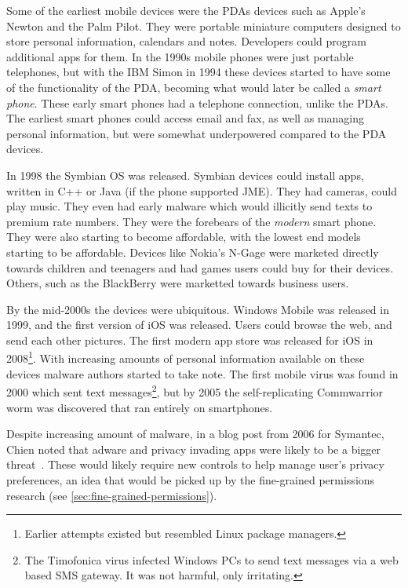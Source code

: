 \documentclass[thesis.tex]{subfiles}
\begin{document}
Some of the earliest mobile devices were the \acp{PDA} devices such as Apple's
Newton and the Palm Pilot. They were portable miniature computers designed to
store personal information, calendars and notes. Developers could program
additional apps for them. In the 1990s mobile phones were just portable
telephones, but with the IBM Simon in 1994 these devices started to have some of
the functionality of the \ac{PDA}, becoming what would later be called a
\emph{smart phone}. These early smart phones had a telephone connection, unlike
the \acp{PDA}. The earliest smart phones could access email and fax, as well as
managing personal information, but were somewhat underpowered compared to the
\ac{PDA} devices.

In 1998 the Symbian OS was released. Symbian devices could install apps, written
in C++ or Java (if the phone supported JME). They had cameras, could play music.
They even had early malware which would illicitly send texts to premium rate
numbers. They were the forebears of the \emph{modern} smart phone. They were
also starting to become affordable, with the lowest end models starting to be
affordable. Devices like Nokia's N-Gage were marketed directly towards children
and teenagers and had games users could buy for their devices. Others, such as
the BlackBerry were marketted towards business users.

By the mid-2000s the devices were ubiquitous. Windows Mobile was released in
1999, and the first version of iOS was released. Users could browse the web, and
send each other pictures. The first modern app store was released for iOS in
2008\footnote{Earlier attempts existed but resembled Linux package managers.}.
With increasing amounts of personal information available on these devices
malware authors started to take note. The first mobile virus was found in 2000
which sent text messages\footnote{The Timofonica virus infected Windows PCs to
send text messages via a web based SMS gateway. It was not harmful, only
irritating.}, but by 2005 the self-replicating Commwarrior worm was discovered
that ran entirely on smartphones.

Despite increasing amount of malware, in a blog post from 2006 for Symantec,
Chien noted that adware and privacy invading apps were likely to be a bigger
threat~\cite{eric_chien_spyware_2006}. These would likely require new controls to
help manage user's privacy preferences, an idea that would be picked up by the
fine-grained permissions research (see \autoref{sec:fine-grained-permissions}).
\end{document}
